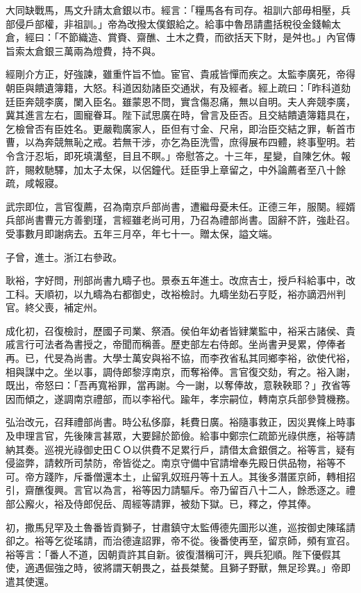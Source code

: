 \begin{pinyinscope}
大同缺戰馬，馬文升請太倉銀以市。經言：「糧馬各有司存。祖訓六部毋相壓，兵部侵戶部權，非祖訓。」帝為改撥太僕銀給之。給事中魯昂請盡括稅役金錢輸太倉，經曰：「不節織造、賞賚、齋醮、土木之費，而欲括天下財，是舛也。」內官傳旨索太倉銀三萬兩為燈費，持不與。

經剛介方正，好強諫，雖重忤旨不恤。宦官、貴戚皆憚而疾之。太監李廣死，帝得朝臣與饋遺簿籍，大怒。科道因劾諸臣交通狀，有及經者。經上疏曰：「昨科道劾廷臣奔競李廣，闌入臣名。雖蒙恩不問，實含傷忍痛，無以自明。夫人奔競李廣，冀其進言左右，圖寵眷耳。陛下試思廣在時，曾言及臣否。且交結饋遺簿籍具在，乞檢曾否有臣姓名。更嚴鞫廣家人，臣但有寸金、尺帛，即治臣交結之罪，斬首市曹，以為奔競無恥之戒。若無干涉，亦乞為臣洗雪，庶得展布四體，終事聖明。若令含汙忍垢，即死填溝壑，目且不瞑。」帝慰答之。十三年，星變，自陳乞休。報許，賜敕馳驛，加太子太保，以侶鐘代。廷臣爭上章留之，中外論薦者至八十餘疏，咸報寢。

武宗即位，言官復薦，召為南京戶部尚書，遭繼母憂未任。正德三年，服闋。經婿兵部尚書曹元方善劉瑾，言經雖老尚可用，乃召為禮部尚書。固辭不許，強赴召。受事數月即謝病去。五年三月卒，年七十一。贈太保，謚文端。

子曾，進士。浙江右參政。

耿裕，字好問，刑部尚書九疇子也。景泰五年進士。改庶吉士，授戶科給事中，改工科。天順初，以九疇為右都御史，改裕檢討。九疇坐劾石亨貶，裕亦謫泗州判官。終父喪，補定州。

成化初，召復檢討，歷國子司業、祭酒。侯伯年幼者皆肄業監中，裕采古諸侯、貴戚言行可法者為書授之，帝聞而稱善。歷吏部左右侍郎。坐尚書尹旻累，停俸者再。已，代旻為尚書。大學士萬安與裕不協，而李孜省私其同鄉李裕，欲使代裕，相與謀中之。坐以事，調侍郎黎淳南京，而奪裕俸。言官復交劾，宥之。裕入謝，既出，帝怒曰：「吾再寬裕罪，當再謝。今一謝，以奪俸故，意鞅鞅耶？」孜省等因而傾之，遂調南京禮部，而以李裕代。踰年，孝宗嗣位，轉南京兵部參贊機務。

弘治改元，召拜禮部尚書。時公私侈靡，耗費日廣。裕隨事救正，因災異條上時事及申理言官，先後陳言甚眾，大要歸於節儉。給事中鄭宗仁疏節光祿供應，裕等請納其奏。巡視光祿御史田ＣＯ以供費不足累行戶，請借太倉銀償之。裕等言，疑有侵盜弊，請敕所司禁防，帝皆從之。南京守備中官請增奉先殿日供品物，裕等不可。帝方踐阼，斥番僧還本土，止留乳奴班丹等十五人。其後多潛匿京師，轉相招引，齋醮復興。言官以為言，裕等因力請驅斥。帝乃留百八十二人，餘悉逐之。禮部公廨火，裕及侍郎倪岳、周經等請罪，被劾下獄。已，釋之，停其俸。

初，撒馬兒罕及土魯番皆貢獅子，甘肅鎮守太監傅德先圖形以進，巡按御史陳瑤請卻之。裕等乞從瑤請，而治德違詔罪，帝不從。後番使再至，留京師，頻有宣召。裕等言：「番人不道，因朝貢許其自新。彼復潛稱可汗，興兵犯順。陛下優假其使，適遇倔強之時，彼將謂天朝畏之，益長桀驁。且獅子野獸，無足珍異。」帝即遣其使還。


\end{pinyinscope}
